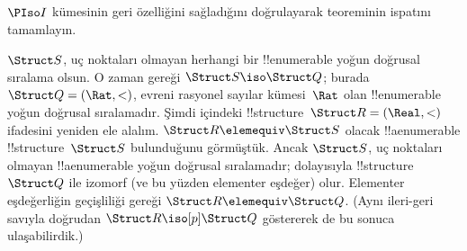 \documentclass[../../../include/open-logic-section]{subfiles}
\begin{document}
\begin{prob}
  $\PIso I$ kümesinin geri özelliğini sağladığını doğrulayarak
   teoreminin ispatını tamamlayın.
\end{prob}

\begin{rem}
  $\Struct S$, uç noktaları olmayan herhangi bir !!{enumerable} yoğun
  doğrusal sıralama olsun. O zaman  gereği
  $\Struct S\iso\Struct Q$; burada $\Struct Q=(\Rat,<)$, evreni
  rasyonel sayılar kümesi~$\Rat$ olan !!{enumerable} yoğun doğrusal
  sıralamadır. Şimdi  içindeki
  !!{structure}~$\Struct R=(\Real,<)$ ifadesini yeniden ele alalım.
  $\Struct R\elemequiv\Struct S$ olacak !!a{enumerable}
  !!{structure}~$\Struct S$ bulunduğunu görmüştük. Ancak $\Struct S$,
  uç noktaları olmayan !!a{enumerable} yoğun doğrusal sıralamadır;
  dolayısıyla !!{structure}~$\Struct Q$ ile izomorf (ve bu yüzden
  elementer eşdeğer) olur. Elementer eşdeğerliğin geçişliliği gereği
  $\Struct R\elemequiv\Struct Q$. (Aynı ileri-geri savıyla doğrudan
  $\Struct R\iso[p]\Struct Q$ göstererek de bu sonuca ulaşabilirdik.)
\end{rem}
\end{document}
